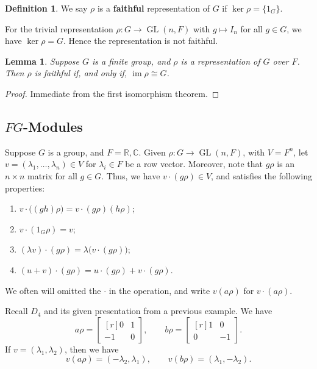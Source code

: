 \documentclass[11pt, notitlepage]{article}
\numberwithin{equation}{section}
\theoremstyle{plain}
\newtheorem{lemma}[theorem]{Lemma}
\theoremstyle{definition}
\newtheorem{definition}[theorem]{Definition}
\newenvironment{example}
	{\pushQED{\qed}\renewcommand{\qedsymbol}{$\blacktriangleleft$}\examplex}
	{\popQED\endexamplex}
\newcommand{\R}{\mathbb{R}}
\newcommand{\C}{\mathbb{C}}
\DeclareMathOperator{\GL}{GL}
\DeclareMathOperator{\im}{im}
\begin{document}
\begin{definition}
We say $\rho$ is a \textbf{faithful} representation of $G$ if $\ker \rho = \{1_G\}$. 
\end{definition}

\begin{example}
For the trivial representation $\rho : G \to \GL(n,F)$ with $g \mapsto I_n$ for all $g \in G$, we have $\ker \rho = G$. Hence the representation is not faithful.
\end{example}

\begin{lemma}
Suppose $G$ is a finite group, and $\rho$ is a representation of $G$ over $F$. Then $\rho$ is faithful if, and only if, $\im \rho \cong G$.
\end{lemma}

\begin{proof}
Immediate from the first isomorphism theorem.
\end{proof}



\subsection{$FG$-Modules}



Suppose $G$ is a group, and $F = \R,\C$. Given $\rho : G \to \GL(n,F)$, with $V = F^n$, let $v = (\lambda_1,\dots,\lambda_n) \in V$ for $\lambda_i \in F$ be a row vector. Moreover, note that $g\rho$ is an $n \times n$ matrix for all $g \in G$. Thus, we have $v \cdot (g\rho) \in V$, and satisfies the following properties:
\begin{enumerate}[label=(\roman*)]
    \item $v \cdot \big( (gh)\rho \big) = v \cdot (g\rho)(h\rho)$;
    \item $v \cdot (1_G\rho) = v$;
    \item $(\lambda v) \cdot (g\rho) = \lambda \big( v \cdot (g\rho) \big)$;
    \item $(u + v) \cdot (g\rho) = u \cdot (g\rho) + v \cdot (g\rho)$.
\end{enumerate}

We often will omitted the $\cdot$ in the operation, and write $v(a\rho)$ for $v \cdot (a\rho)$.

\begin{example}
Recall $D_4$ and its given presentation from a previous example. We have
\[
    a\rho = \begin{bmatrix*}[r]
        0 & 1\\
        -1 & 0
    \end{bmatrix*}, \qquad b\rho = \begin{bmatrix*}[r]
        1 & 0\\
        0 & -1
    \end{bmatrix*}.
\]
If $v = (\lambda_1,\lambda_2)$, then we have
\[
    v(a\rho) = (-\lambda_2,\lambda_1), \qquad v(b\rho) = (\lambda_1,-\lambda_2).
\]
\end{example}
\end{document}
